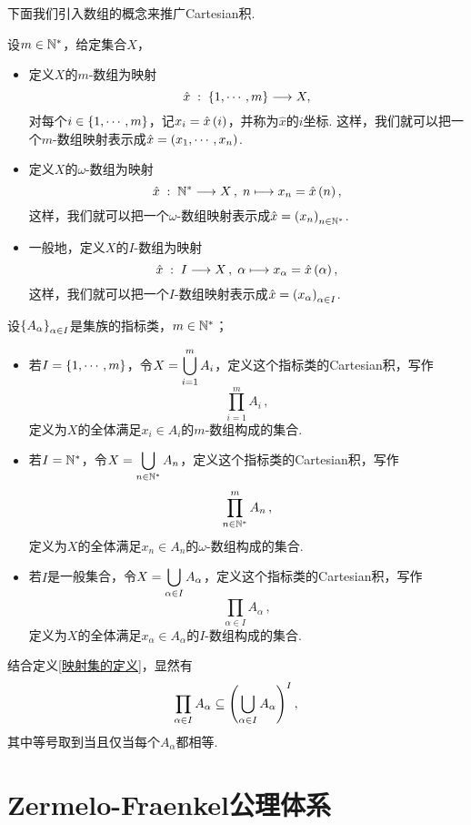 下面我们引入数组的概念来推广Cartesian积.
\begin{definition}[数组]
设$m\in\mathbb{N}^*$，给定集合$X$，
\begin{itemize}
    \item 定义$X$的$m$-数组为映射
    \[  \hat{x} \;:\; \left\{  1,\cdots,m \right\} \longrightarrow X ,   \] 对每个$i\in\left\{  1,\cdots,m \right\}$，记$x_i=\hat{x}\left(i\right)$，并称为$\hat{x}$的$i$坐标. 这样，我们就可以把一个$m$-数组映射表示成$\hat{x}=\left(  x_1,\cdots,x_n \right)$.
    \item 定义$X$的$\omega$-数组为映射
    \[  \hat{x} \;:\; \mathbb{N}^*\longrightarrow X\,,\; n\longmapsto x_n=\hat{x}\left(n\right),  \]
    这样，我们就可以把一个$\omega$-数组映射表示成$\hat{x}=\left( x_n \right)_{n\in\mathbb{N}^*}$.
    \item 一般地，定义$X$的$I$-数组为映射
    \[  \hat{x} \;:\; I\longrightarrow X\,,\; \alpha\longmapsto x_\alpha=\hat{x}\left(\alpha\right),  \]
    这样，我们就可以把一个$I$-数组映射表示成$\hat{x}=\left( x_\alpha \right)_{\alpha\in I}$.
\end{itemize}
\end{definition}
\begin{definition}[一般的Cartesian积]
    设$\left\{ A_\alpha \right\}_{\alpha\in I}$是集族的指标类，$m\in\mathbb{N}^*$；
    \begin{itemize}
        \item 若$I=\left\{  1,\cdots,m \right\}$，令$X=\displaystyle \bigcup_{i=1}^m A_i $，定义这个指标类的Cartesian积，写作\[  \prod_{i=1}^m  A_i\,,  \] 定义为$X$的全体满足$x_i\in A_i$的$m$-数组构成的集合.
        \item 若$I=\mathbb{N}^*$，令$X=\displaystyle \bigcup_{n\in\mathbb{N}^*} A_n $，定义这个指标类的Cartesian积，写作\[  \prod_{n\in\mathbb{N}^*}^m  A_n\,,  \] 定义为$X$的全体满足$x_n\in A_n$的$\omega$-数组构成的集合.
        \item 若$I$是一般集合，令$X=\displaystyle \bigcup_{\alpha\in I} A_\alpha $，定义这个指标类的Cartesian积，写作\[  \prod_{\alpha\in I}  A_\alpha\,,  \] 定义为$X$的全体满足$x_\alpha\in A_\alpha$的$I$-数组构成的集合.
    \end{itemize}
\end{definition}
\begin{remark}
    结合定义\ref{映射集的定义}，显然有 \[   \prod_{\alpha\in I}  A_\alpha \subseteq \left( \bigcup_{\alpha\in I} A_\alpha  \right)^I,  \] 其中等号取到当且仅当每个$A_\alpha$都相等.
\end{remark}




\section{Zermelo-Fraenkel公理体系}\label{ZF公理体系}


